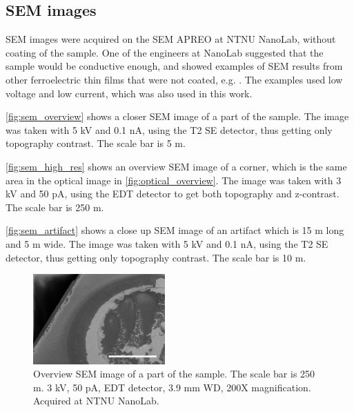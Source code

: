 \subsection{SEM images}
\label{results:SEM}

SEM images were acquired on the SEM APREO at NTNU NanoLab, without coating of the sample.
One of the engineers at NanoLab suggested that the sample would be conductive enough, and showed examples of SEM results from other ferroelectric thin films that were not coated, e.g. \cite{hunnestad_visualizing_2019}.
The examples used low voltage and low current, which was also used in this work.

\autoref{fig:sem_overview} shows a closer SEM image of a part of the sample.
The image was taken with 5 kV and 0.1 nA, using the T2 SE detector, thus getting only topography contrast.
The scale bar is 5 \textmu m.

\autoref{fig:sem_high_res} shows an overview SEM image of a corner, which is the same area in the optical image in \autoref{fig:optical_overview}.
The image was taken with 3 kV and 50 pA, using the EDT detector to get both topography and z-contrast.
The scale bar is 250 \textmu m.

\autoref{fig:sem_artifact} shows a close up SEM image of an artifact which is 15 \textmu m long and 5 \textmu m wide.
The image was taken with 5 kV and 0.1 nA, using the T2 SE detector, thus getting only topography contrast.
The scale bar is 10 \textmu m.

\begin{figure}[ht]
    \centering
    \includegraphics[width=0.45\textwidth]{figures/sem_overview_250um.jpg}
    \caption{Overview SEM image of a part of the sample.
        The scale bar is 250 \textmu m.
        3 kV, 50 pA, EDT detector, 3.9 mm WD, 200X magnification.
        Acquired at NTNU NanoLab.
    }
    \label{fig:sem_overview}
\end{figure}

